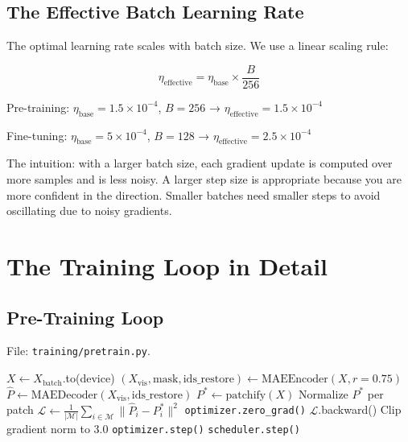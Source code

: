 \documentclass[12pt, a4paper]{report}
\newcommand{\R}{\mathbb{R}}
\begin{document}
\section{The Effective Batch Learning Rate}

The optimal learning rate scales with batch size. We use a linear scaling rule:

\begin{equation}
\eta_{\text{effective}} = \eta_{\text{base}} \times \frac{B}{256}
\end{equation}

Pre-training: $\eta_{\text{base}} = 1.5 \times 10^{-4}$, $B = 256$ → $\eta_{\text{effective}} = 1.5 \times 10^{-4}$

Fine-tuning: $\eta_{\text{base}} = 5 \times 10^{-4}$, $B = 128$ → $\eta_{\text{effective}} = 2.5 \times 10^{-4}$

The intuition: with a larger batch size, each gradient update is computed over more samples and is less noisy. A larger step size is appropriate because you are more confident in the direction. Smaller batches need smaller steps to avoid oscillating due to noisy gradients.

\chapter{The Training Loop in Detail}

\section{Pre-Training Loop}

File: \texttt{training/pretrain.py}.

\begin{algorithm}[H]
\caption{MAE Pre-Training (one epoch)}
\begin{algorithmic}[1]
    \State $X \gets X_{\text{batch}}$.to(device) 
    \State $(X_{\text{vis}}, \text{mask}, \text{ids\_restore}) \gets \text{MAEEncoder}(X, r=0.75)$
    \State $\hat{P} \gets \text{MAEDecoder}(X_{\text{vis}}, \text{ids\_restore})$ \Comment{$\hat{P} \in \R^{B \times 64 \times 48}$}
    \State $P^* \gets \text{patchify}(X)$ 
    \State Normalize $P^*$ per patch
    \State $\mathcal{L} \gets \frac{1}{|\mathcal{M}|}\sum_{i \in \mathcal{M}} \|\hat{P}_i - P_i^*\|^2$ 
    \State \texttt{optimizer.zero\_grad()}
    \State $\mathcal{L}$.backward() 
    \State Clip gradient norm to 3.0 
    \State \texttt{optimizer.step()} 
    \State \texttt{scheduler.step()} 
\EndFor
\end{algorithmic}
\end{algorithm}
\end{document}
